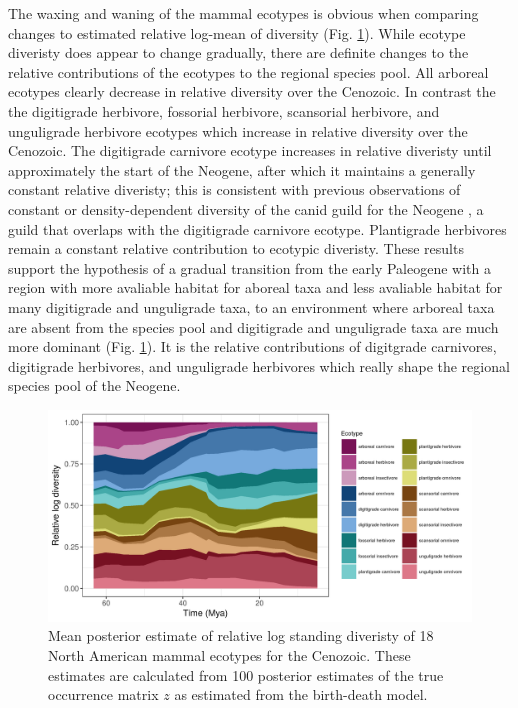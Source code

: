 \documentclass[12pt,letterpaper]{article}
\begin{document}
The waxing and waning of the mammal ecotypes is obvious when comparing changes to estimated relative log-mean of diversity (Fig. \ref{fig:ecotype_relative}). While ecotype diveristy does appear to change gradually, there are definite changes to the relative contributions of the ecotypes to the regional species pool. All arboreal ecotypes clearly decrease in relative diversity over the Cenozoic. In contrast the the digitigrade herbivore, fossorial herbivore, scansorial herbivore, and unguligrade herbivore ecotypes which increase in relative diversity over the Cenozoic. The digitigrade carnivore ecotype increases in relative diveristy until approximately the start of the Neogene, after which it maintains a generally constant relative diveristy; this is consistent with previous observations of constant or density-dependent diversity of the canid guild for the Neogene \citep{Valkenburgh1999,Silvestro2015b,Slater2015c}, a guild that overlaps with the digitigrade carnivore ecotype. Plantigrade herbivores remain a constant relative contribution to ecotypic diveristy. These results support the hypothesis of a gradual transition from the early Paleogene with a region with more avaliable habitat for aboreal taxa and less avaliable habitat for many digitigrade and unguligrade taxa, to an environment where arboreal taxa are absent from the species pool and digitigrade and unguligrade taxa are much more dominant (Fig. \ref{fig:ecotype_relative}). It is the relative contributions of digitgrade carnivores, digitigrade herbivores, and unguligrade herbivores which really shape the regional species pool of the Neogene. 


\begin{figure}[ht]
  \centering
  \includegraphics[width=\textwidth,height=0.5\textheight,keepaspectratio=true]{figure/relative_diversity}
  \caption[Relative mammal ecotype log-diversity for the Cenozoic]{Mean posterior estimate of relative log standing diveristy of 18 North American mammal ecotypes for the Cenozoic. These estimates are calculated from 100 posterior estimates of the true occurrence matrix \(z\) as estimated from the birth-death model.}
  \label{fig:ecotype_relative}
\end{figure}
\end{document}
